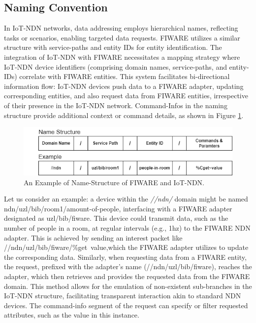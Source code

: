 \documentclass[conference]{IEEEtran}
\begin{document}
\subsection{Naming Convention}
In IoT-NDN networks, data addressing employs hierarchical names, reflecting tasks or scenarios, enabling targeted data requests. \cite[Hail, 2019]{b5}
FIWARE utilizes a similar structure with service-paths and entity IDs for entity identification.
The integration of IoT-NDN with FIWARE necessitates a mapping strategy where IoT-NDN device identifiers (comprising domain names, service-paths, and entity-IDs) correlate with FIWARE entities.
This system facilitates bi-directional information flow: IoT-NDN devices push data to a FIWARE adapter, updating corresponding entities, and also request data from FIWARE entities, irrespective of their presence in the IoT-NDN network.
Command-Infos in the naming structure provide additional context or command details, as shown in Figure \ref{ndn-example}.
\begin{figure}[tb]
    \centerline{\includegraphics[scale=.4]{ndn-example.png}}
    \caption{An Example of Name-Structure of FIWARE and IoT-NDN.}
    \label{ndn-example}
\end{figure}
\vspace{6pt}
Let us consider an example: a device within the \textit{//ndn/} domain might be named ndn/uzl/bib/room1/amount-of-people, interfacing with a FIWARE adapter designated as uzl/bib/fiware.
This device could transmit data, such as the number of people in a room, at regular intervals (e.g., 1hz) to the FIWARE NDN adapter.
This is achieved by sending an interest packet like //ndn/uzl/bib/fiware/\%get~value,which the FIWARE adapter utilizes to update the corresponding data.
Similarly, when requesting data from a FIWARE entity, the request, prefixed with the adapter's name (//ndn/uzl/bib/fiware), reaches the adapter, which then retrieves and provides the requested data from the FIWARE domain.
This method allows for the emulation of non-existent sub-branches in the IoT-NDN structure, facilitating transparent interaction akin to standard NDN devices.
The command-info segment of the request can specify or filter requested attributes, such as the value in this instance.
\end{document}
